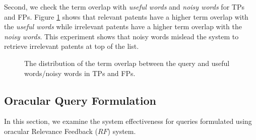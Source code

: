 Second, we check the term overlap with \textit{useful words} and \textit{noisy words} for TPs and FPs. Figure \ref{fig:usefulnoisy} shows that relevant patents have a higher term overlap with the \textit{useful words} while irrelevant patents have a higher term overlap with the \textit{noisy words}. This experiment shows that noisy words mislead the system to retrieve irrelevant patents at top of the list. 
\begin{figure}[t!]
\begin{centering}
 \hspace*{1.5cm}  
\par\end{centering} 

\protect\caption{The distribution of the term overlap between the query and useful words/noisy words in TPs and FPs.}
\label{fig:usefulnoisy}
\end{figure}
\newpage
\subsection{Oracular Query Formulation}
\label{sec:OracularQueryFormulation}
In this section, we examine the system effectiveness for queries formulated using oracular Relevance Feedback ($\mathit{RF}$) system.

